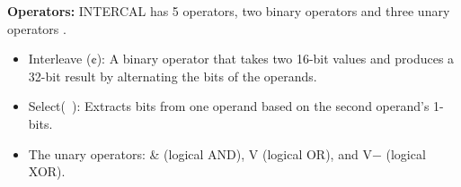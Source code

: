 \documentclass{article}
\begin{document}
\textbf{Operators:}
INTERCAL has 5 operators, two binary operators and three unary operators \cite{Woods}. 
\begin{itemize}
    \item Interleave (¢): A binary operator that takes two 16-bit values and produces a 32-bit result by alternating the bits of the operands.
\end{itemize}
\begin{itemize}
    \item Select(~): Extracts bits from one operand based on the second operand’s 1-bits. 
\end{itemize}
\begin{itemize}
    \item The unary operators: & (logical AND), V (logical OR), and V− (logical XOR).
\end{itemize}
\end{document}
